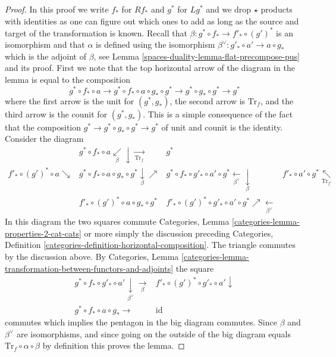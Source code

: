 \begin{proof}
In this proof we write $f_*$ for $Rf_*$ and $g^*$ for $Lg^*$ and we
drop $\star$ products with identities as one can figure out which ones
to add as long as the source and target of the transformation is known.
Recall that $\beta : g^* \circ f_* \to f'_* \circ (g')^*$ is an isomorphism
and that $\alpha$ is defined using
the isomorphism $\beta^\vee : g'_* \circ a' \to a \circ g_*$
which is the adjoint of $\beta$, see Lemma \ref{spaces-duality-lemma-flat-precompose-pus}
and its proof. First we note that the top horizontal arrow
of the diagram in the lemma is equal to the composition
$$
g^* \circ f_* \circ a \to
g^* \circ f_* \circ a \circ g_* \circ g^* \to
g^* \circ g_* \circ g^* \to g^*
$$
where the first arrow is the unit for $(g^*, g_*)$, the second arrow
is $\text{Tr}_f$, and the third arrow is the counit for $(g^*, g_*)$.
This is a simple consequence of the fact that the composition
$g^* \to g^* \circ g_* \circ g^* \to g^*$ of unit and counit is the identity.
Consider the diagram
$$
\begin{array}{cccc} & g^* \circ f_* \circ a \underset{\beta}{\swarrow}\downarrow\underset{\text{Tr}_f}{\longrightarrow} & g^* &  \\ f'_* \circ (g')^* \circ a \searrow & g^* \circ f_* \circ a \circ g_* \circ g^* \underset{\beta}{\downarrow}\nearrow & g^* \circ f_* \circ g'_* \circ a' \circ g^* \underset{\beta^\vee}{\longleftarrow}\underset{\beta}{\downarrow} & f'_* \circ a' \circ g^* \underset{\text{Tr}_{f'}}{\nwarrow} \\  & f'_* \circ (g')^* \circ a \circ g_* \circ g^* & f'_* \circ (g')^* \circ g'_* \circ a' \circ g^* \nearrow\underset{\beta^\vee}{\longleftarrow} & \end{array}
$$
In this diagram the two squares commute
Categories, Lemma \ref{categories-lemma-properties-2-cat-cats}
or more simply the discussion preceding
Categories, Definition \ref{categories-definition-horizontal-composition}.
The triangle commutes by the discussion above. By
Categories, Lemma
\ref{categories-lemma-transformation-between-functors-and-adjoints}
the square
$$
\begin{array}{cc}g^* \circ f_* \circ g'_* \circ a' \underset{\beta^\vee}{\downarrow}\underset{\beta}{\longrightarrow} & f'_* \circ (g')^* \circ g'_* \circ a' \downarrow \\ g^* \circ f_* \circ a \circ g_* \longrightarrow & \text{id}\end{array}
$$
commutes which implies the pentagon in the big diagram commutes.
Since $\beta$ and $\beta^\vee$ are isomorphisms, and since going on
the outside of the big diagram equals
$\text{Tr}_f \circ \alpha \circ \beta$ by definition this proves the lemma.
\end{proof}

